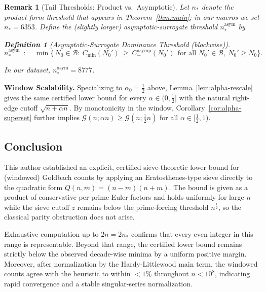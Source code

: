 \documentclass[11pt]{article}
\theoremstyle{inline}
\newtheorem*{remark}{Remark}
\theoremstyle{break}
\theoremstyle{break}
\theoremstyle{break}
\theoremstyle{break}
\theoremstyle{break}
\theoremstyle{break}
\theoremstyle{break}
\newtheorem{definition}{Definition}
\theoremstyle{inline}
\newcommand{\xMertens}{6353} %
\newcommand{\xNasymStar}{8777}  %
\newcommand{\Cmeas}{C}              %
\newcommand{\CminusAsymp}{C_{-}^{\mathrm{asymp}}}
\newcommand{\nprodstar}{n_{\ast}}  %
\newcommand{\nasymstar}{n_{\ast}^{\mathrm{asym}}}  %
\begin{document}
\begin{remark}[Tail Thresholds: Product vs.\ Asymptotic]
\label{rem:tail-thresholds}
Let \(\nprodstar\) denote the product-form threshold that appears in Theorem~\ref{thm:main};
in our macros we set \(\nprodstar=\xMertens\).
Define the (slightly larger) asymptotic-surrogate threshold \(\nasymstar\) by
\begin{definition}[Asymptotic-Surrogate Dominance Threshold (blockwise)]\label{def:nasym-block}
\begin{equation}
\nasymstar \ :=\ \min\Big\{\,N_0\in\mathcal B:\ 
\Cmeas_{\min}(N_0')\ \ge\ \CminusAsymp(N_0')\ \ \text{for all } N_0'\in\mathcal B,\ N_0'\ge N_0\Big\}.
\end{equation}
\end{definition}
In our dataset, \(\nasymstar=\xNasymStar\).
\end{remark}

\noindent\textbf{Window Scalability.}
Specializing to \(\alpha_0=\tfrac12\) above, Lemma~\ref{lem:alpha-rescale} gives the same certified lower bound for every \(\alpha\in(0,\tfrac12]\) with the natural right-edge cutoff \(\sqrt{n+\alpha n}\). 
By monotonicity in the window, Corollary~\ref{cor:alpha-superset} further implies \(\mathcal{G}(n;\alpha n)\ge \mathcal{G}(n;\tfrac12 n)\) for all \(\alpha\in[\tfrac12,1)\).

\subsection{Conclusion}\label{sec:conclusion}
This author established an explicit, certified sieve-theoretic lower bound for (windowed) Goldbach counts by applying an Eratosthenes-type sieve directly to the quadratic form \(Q(n,m)=(n-m)(n+m)\). The bound is given as a product of conservative per-prime Euler factors and holds uniformly for large \(n\) while the sieve cutoff \(z\) remains below the prime-forcing threshold \(n^{\frac{1}{2}}\), so the classical parity obstruction does not arise.

Exhaustive computation up to \(2n=2\nprodstar\) confirms that every even integer in this range is representable. Beyond that range, the certified lower bound remains strictly below the observed decade-wise minima by a uniform positive margin. Moreover, after normalization by the Hardy-Littlewood main term, the windowed counts agree with the heuristic to within \(<1\%\) throughout \(n < 10^{8}\), indicating rapid convergence and a stable singular-series normalization.
\end{document}
